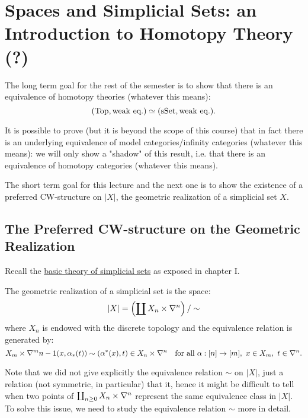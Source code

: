 
\chapter{Spaces and Simplicial Sets: an Introduction to Homotopy Theory (?)}\label{chapter:the-cool-chapter}


The long term goal for the rest of the semester is to show that there is an equivalence of homotopy theories (whatever this means):
\[({\mathrm{Top}},\text{weak eq.})\simeq({\mathrm{sSet}},\text{weak eq.}).\]

It is possible to prove (but it is beyond the scope of this course) that in fact there is an underlying equivalence of model categories/infinity categories (whatever this means): we will only show a "shadow" of this result, i.e. that there is an equivalence of homotopy categories (whatever this means).

The short term goal for this lecture and the next one is to show the existence of a preferred CW-structure on $|X|$, the geometric realization of a simplicial set $X$.

\section{The Preferred CW-structure on the Geometric Realization}
Recall the \hyperref[section:reminder-on-sset]{basic theory of simplicial sets} as exposed in chapter I.

The geometric realization of a simplicial set is the space:
\[|X|=\left(\coprod X_n\times\nabla^n\right)/\sim\]
where $X_n$ is endowed with the discrete topology and the equivalence relation is generated by:
\[X_m\times\nabla^m\cont(x,\alpha_*(t))\sim(\alpha^*(x),t)\in X_n\times\nabla^n\quad\text{for all }\alpha:[n]\to[m],\ x\in X_m,\ t\in\nabla^n.\]

Note that we did not give explicitly the equivalence relation $\sim$ on $|X|$, just a relation (not symmetric, in particular) that  it,
hence it might be difficult to tell when two points of $\coprod_{n\ge0} X_n\times\nabla^n$ represent the same equivalence class in $|X|$.
To solve this issue, we need to study the equivalence relation $\sim$ more in detail.

